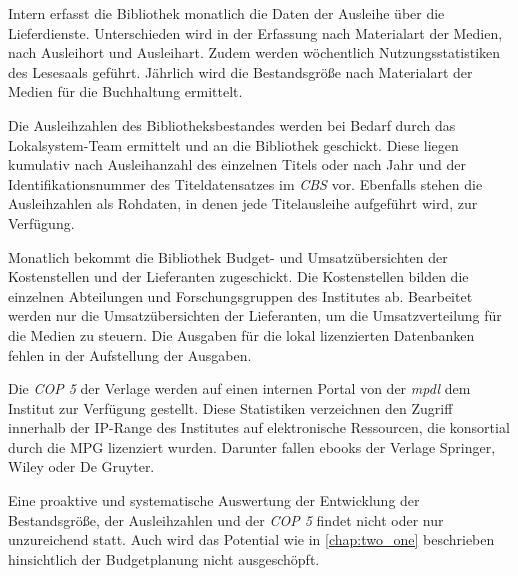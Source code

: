 \endgroup


Intern erfasst die Bibliothek monatlich die Daten der Ausleihe über die Lieferdienste. Unterschieden 
wird in der Erfassung nach Materialart der Medien, nach Ausleihort und Ausleihart. Zudem werden wöchentlich 
Nutzungsstatistiken des Lesesaals geführt. Jährlich wird die Bestandsgröße nach 
Materialart der Medien für die Buchhaltung ermittelt.

Die Ausleihzahlen des Bibliotheksbestandes werden bei Bedarf durch das Lokalsystem-Team ermittelt und an die Bibliothek geschickt. 
Diese liegen kumulativ nach Ausleihanzahl des einzelnen Titels oder nach Jahr und der Identifikationsnummer des Titeldatensatzes im 
\textit{\acrshort{CBS}} vor. Ebenfalls stehen die Ausleihzahlen als Rohdaten, in denen jede Titelausleihe aufgeführt wird, zur Verfügung.

Monatlich bekommt die Bibliothek Budget- und Umsatzübersichten der Kostenstellen und der Lieferanten zugeschickt. 
Die Kostenstellen bilden die einzelnen Abteilungen und Forschungsgruppen des Institutes ab. 
Bearbeitet werden nur die Umsatzübersichten der Lieferanten, um die Umsatzverteilung für die Medien zu steuern.
Die Ausgaben für die lokal lizenzierten Datenbanken fehlen in der Aufstellung der Ausgaben. 

Die \textit{\acrfull{COP 5}} der Verlage werden auf einen internen Portal von der \textit{\acrshort{mpdl}} dem Institut zur Verfügung gestellt.
Diese Statistiken verzeichnen den Zugriff innerhalb der IP-Range des Institutes auf elektronische Ressourcen, 
die konsortial durch die \acrshort{MPG} lizenziert wurden. Darunter fallen ebooks der Verlage 
Springer, Wiley oder De Gruyter. 

Eine proaktive und systematische Auswertung der Entwicklung der Bestandsgröße, der Ausleihzahlen und der \textit{\acrshort{COP 5}} findet nicht
oder nur unzureichend statt. Auch wird das Potential wie in \autoref{chap:two_one} beschrieben hinsichtlich der Budgetplanung
nicht ausgeschöpft.



